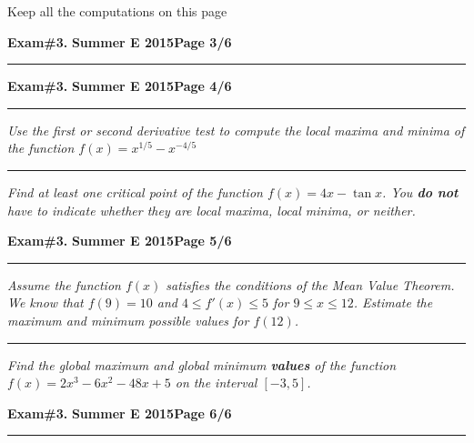 \documentclass[12pt]{article}
\begin{document}
Keep all the computations on this page
\newpage

\hfill{\large\bf Exam\#3.}\hfill{\large\bf
  Summer E 2015}\hfill{\large\bf Page 3/6}\hrule

\newpage 

\hfill{\large\bf Exam\#3.}\hfill{\large\bf
  Summer E 2015}\hfill{\large\bf Page 4/6}\hrule

\bigskip
{\problem[10 pts] \em Use the first or second derivative test to compute the local maxima and minima of the function $f(x) = x^{1/5} - x^{-4/5}$}

\vspace{10cm}
\hrule
{\problem[10] \em Find at least one critical point of the function $f(x) = 4x - \tan x$.  You \textbf{do not} have to indicate whether they are local maxima, local minima, or neither.}
\vspace{9cm}
\begin{flushright}
\end{flushright}
\newpage

\hfill{\large\bf Exam\#3.}\hfill{\large\bf
  Summer E 2015}\hfill{\large\bf Page 5/6}\hrule

\bigskip
{\problem[10 pts] \em Assume the function $f(x)$ satisfies the conditions of the Mean Value Theorem.  We know that $f(9)= 10$ and $4 \leq f'(x) \leq 5$ for $9 \leq x \leq 12$.  Estimate the maximum and minimum possible values for $f(12)$.}

\vspace{10cm}
\hrule
{\problem[10pts] \em Find the global maximum and global minimum \textbf{values} of the function $f(x)=2x^3-6x^2-48x+5$ on the interval $[-3,5]$.}
\newpage


\hfill{\large\bf Exam\#3.}\hfill{\large\bf
  Summer E 2015}\hfill{\large\bf Page 6/6}\hrule
\end{document}
